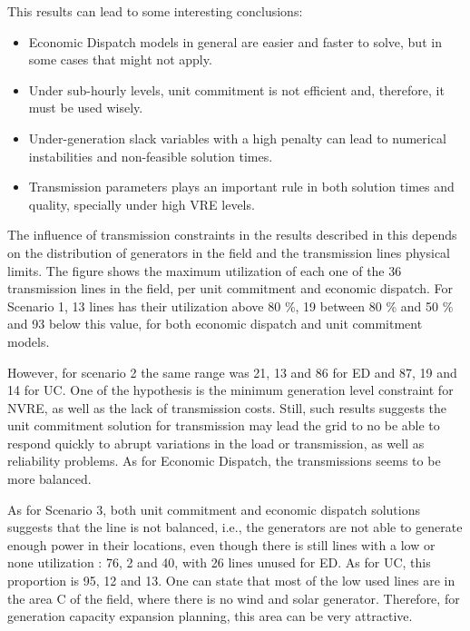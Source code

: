 \documentclass[12pt,LUDisStyle,twosided]{book}
\begin{document}
This results can lead to some interesting conclusions:

\begin{itemize}
\item Economic Dispatch models in general are easier and faster to solve, but in some cases that might not apply.
\item Under sub-hourly levels, unit commitment is not efficient and, therefore, it must be used wisely.
\item Under-generation slack variables with a high penalty can lead to numerical instabilities and non-feasible solution times.
\item Transmission parameters plays an important rule in both solution times and quality, specially under high VRE levels.
\end{itemize}

The influence of transmission constraints in the results described in this depends on the distribution of generators in the field and the transmission lines physical limits. The figure \label{fig:maximumutilizaton} shows the maximum utilization of each one of the 36 transmission lines in the field, per unit commitment and economic dispatch. For Scenario 1, 13 lines has their utilization above 80 \%,  19 between 80 \% and 50 \% and 93 below this value, for both economic dispatch and unit commitment models. 

However, for scenario 2 the same range was 21, 13 and 86 for ED and 87, 19 and 14 for UC. One of the hypothesis is the minimum generation level constraint for NVRE, as well as the lack of transmission costs. Still, such results suggests the unit commitment solution for transmission may lead the grid to no be able to respond quickly to abrupt variations in the load or transmission, as well as reliability problems. As for Economic Dispatch, the transmissions seems to be more balanced.

As for Scenario 3, both unit commitment and economic dispatch solutions suggests that the line is not balanced, i.e., the generators are not able to generate enough power in their locations, even though there is still lines with a low or none utilization : 76, 2 and 40, with 26 lines unused for ED. As for UC, this proportion is 95, 12 and 13. One can state that most of the low used lines are in the area C of the field, where there is no wind and solar generator. Therefore, for generation capacity expansion planning, this area can be very attractive.
\end{document}
